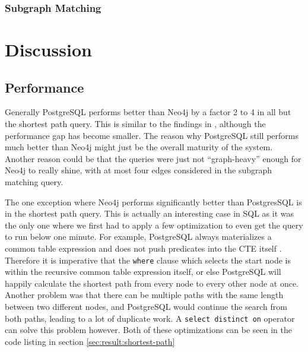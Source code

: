\documentclass[11pt, a4paper,oneside,chapterprefix=false]{scrbook}
\begin{document}
\subsection{Subgraph Matching} \label{sec:result:subgraph-matching}





\chapter{Discussion} \label{chp:Discussion}

\section{Performance}

Generally PostgreSQL performs better than Neo4j by a factor 2 to 4 in all but the shortest path query.
This is similar to the findings in \cite{graphdbbenchmark}, although the performance gap has become smaller.
The reason why PostgreSQL still performs much better than Neo4j might just be the overall maturity of the system.
Another reason could be that the queries were just not ``graph-heavy'' enough for Neo4j to really shine, with at most four edges considered in the subgraph matching query.

The one exception where Neo4j performs significantly better than PostgresSQL is in the shortest path query.
This is actually an interesting case in SQL as it was the only one where we first had to apply a few optimization to even get the query to run below one minute. For example, PostgreSQL always materializes a common table expression and does not push predicates into the CTE itself \cite{postgresMaterialize}.
Therefore it is imperative that the \lstinline{where} clause which selects the start node is within the recursive common table expression itself, or else PostgreSQL will happily calculate the shortest path from every node to every other node at once.
Another problem was that there can be multiple paths with the same length between two different nodes, and PostgreSQL would continue the search from both paths, leading to a lot of duplicate work. A \lstinline{select distinct on} operator can solve this problem however.
Both of these optimizations can be seen in the code listing in section \ref{sec:result:shortest-path}
\end{document}
